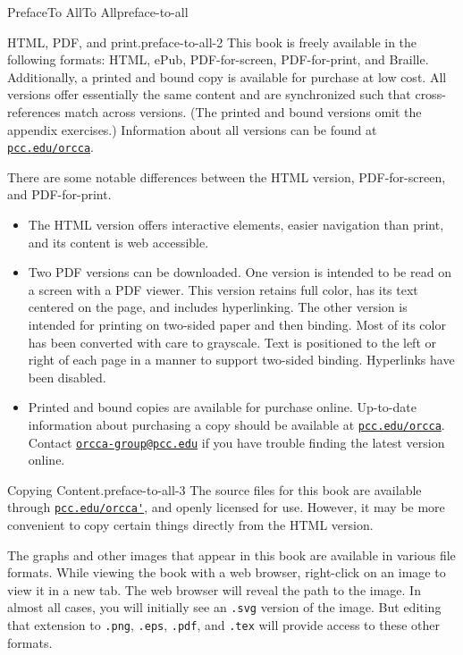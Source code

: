 \documentclass[twoside,10pt,]{book}
\newcommand{\mono}[1]{\texttt{#1}}
\numberwithin{equation}{section}
\begin{document}
\typeout{************************************************}
%
\begin{preface}{Preface}{To All}{}{To All}{}{}{preface-to-all}
\begin{paragraphs}{HTML, PDF, and print.}{preface-to-all-2}%
This book is freely available in the following formats: HTML, ePub, PDF-for-screen, PDF-for-print, and Braille. Additionally, a printed and bound copy is available for purchase at low cost. All versions offer essentially the same content and are synchronized such that cross-references match across versions. (The printed and bound versions omit the appendix exercises.) Information about all versions can be found at \href{https://www.pcc.edu/orcca}{\nolinkurl{pcc.edu/orcca}}.%
\par
There are some notable differences between the HTML version, PDF-for-screen, and PDF-for-print.%
\begin{itemize}[label=\textbullet]
\item{}The HTML version offers interactive elements, easier navigation than print, and its content is web accessible.%
\item{}Two PDF versions can be downloaded.  One version is intended to be read on a screen with a PDF viewer. This version retains full color, has its text centered on the page, and includes hyperlinking. The other version is intended for printing on two-sided paper and then binding. Most of its color has been converted with care to grayscale. Text is positioned to the left or right of each page in a manner to support two-sided binding. Hyperlinks have been disabled.%
\item{}Printed and bound copies are available for purchase online. Up-to-date information about purchasing a copy should be available at \href{https://www.pcc.edu/orcca}{\nolinkurl{pcc.edu/orcca}}. Contact \href{mailto:orcca-group@pcc.edu}{\nolinkurl{orcca-group@pcc.edu}} if you have trouble finding the latest version online.%
\end{itemize}
%
\end{paragraphs}%
\begin{paragraphs}{Copying Content.}{preface-to-all-3}%
The source files for this book are available through \href{https://www.pcc.edu/orcca}{\nolinkurl{pcc.edu/orcca'}}, and openly licensed for use. However, it may be more convenient to copy certain things directly from the HTML version.%
\par
The graphs and other images that appear in this book are available in various file formats. While viewing the book with a web browser, right-click on an image to view it in a new tab. The web browser will reveal the path to the image. In almost all cases, you will initially see an \mono{.svg} version of the image. But editing that extension to \mono{.png}, \mono{.eps}, \mono{.pdf}, and \mono{.tex} will provide access to these other formats.%

\end{paragraphs}
\end{preface}
\end{document}
